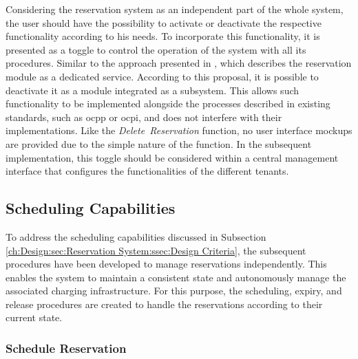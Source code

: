 Considering the reservation system as an independent part of the whole system, the user should have the possibility to activate or deactivate the respective functionality according to his needs.
To incorporate this functionality, it is presented as a toggle to control the operation of the system with all its procedures. Similar to the approach presented in \cite{orcioni_ev_2020}, which describes the reservation module as a dedicated service. According to this proposal, it is possible to deactivate it as a module integrated as a subsystem.
This allows such functionality to be implemented alongside the processes described in existing standards, such as \acrshort{ocpp} or \acrshort{ocpi}, and does not interfere with their implementations.
Like the \textit{Delete~Reservation} function, no user interface mockups are provided due to the simple nature of the function. In the subsequent implementation, this toggle should be considered within a central management interface that configures the functionalities of the different tenants. 

\newpage

\subsection{Scheduling Capabilities}
\label{ch:Design:sec:Reservation System:ssec:Scheduling Capabilities}

To address the scheduling capabilities discussed in Subsection \ref{ch:Design:sec:Reservation System:ssec:Design Criteria}, the subsequent procedures have been developed to manage reservations independently.
This enables the system to maintain a consistent state and autonomously manage the associated charging infrastructure.
For this purpose, the scheduling, expiry, and release procedures are created to handle the reservations according to their current state.

\subsubsection{Schedule Reservation}
\label{ch:Design:sec:Reservation System:ssec:Scheduling Capabilities:sssec:Schedule Reservation}

